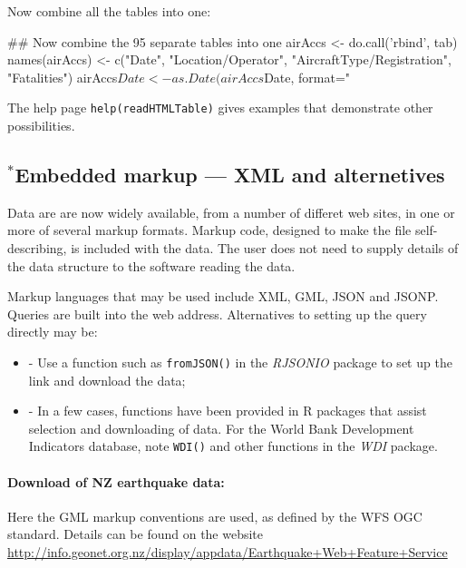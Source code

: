 \documentclass{tufte-book}\usepackage[]{graphicx}\usepackage[]{color}
\newcommand{\txtt}[1]{\texttt{#1}}
\newcommand{\margtt}[1]{{\footnotesize \texttt{#1}}}
\newenvironment{itemizz}%
  {\begin{itemize} %
    \setlength{\itemsep}{2pt}%
    \setlength{\parskip}{2pt}} %
  {\end{itemize}}
\begin{document}
Now combine all the tables into one:
\begin{fullwidth}

\begin{Schunk}
\begin{Sinput}
## Now combine the 95 separate tables into one
airAccs <- do.call('rbind', tab)
names(airAccs) <- c("Date", "Location/Operator",
                     "AircraftType/Registration", "Fatalities")
airAccs$Date <- as.Date(airAccs$Date, format="%
\end{Sinput}
\end{Schunk}

\end{fullwidth}

The help page \margtt{help(readHTMLTable)} gives examples that
  demonstrate other possibilities.

\subsection{$^*$Embedded markup --- XML and alternetives}\label{ss:markup}

Data are are now widely available, from a number of differet web
sites, in one or more of several markup formats.  Markup code,
designed to make the file self-describing, is included with the data.
The user does not need to supply details of the data structure to the
software reading the data.

Markup languages that may be used include XML, GML, JSON and JSONP.
Queries are built into the web address.
Alternatives to setting up the query directly may be:
\begin{itemizz}
  \item[-] Use a function such as \txtt{fromJSON()} in the {\em RJSONIO}
    package to set up the link and download the data;
  \item[-] In a few cases, functions have been provided in R packages
    that assist selection and downloading of data.
    For the World Bank Development Indicators database, note \txtt{WDI()}
    and other functions in the {\em WDI} package.
\end{itemizz}

\paragraph{Download of NZ earthquake data:}
Here the GML markup conventions are used, as defined by
the WFS OGC standard.
Details can be found on the website
  \url{http://info.geonet.org.nz/display/appdata/Earthquake+Web+Feature+Service}
\end{document}
